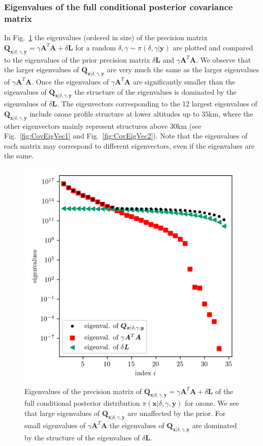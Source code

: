 \subsubsection{Eigenvalues of the full conditional posterior covariance matrix}
In Fig.~\ref{fig:PostCov} the eigenvalues (ordered in size) of the precision matrix $\bm{Q}_{ \bm{x}|\delta, \gamma,\bm{y}}=  \gamma \bm{A}^T \bm{A} + \delta \bm{L} $ for a random $\delta,\gamma \sim \pi(\delta,\gamma|\bm{y})$ are plotted and compared to the eigenvalues of the prior precision matrix $\delta \bm{L}$ and $\gamma \bm{A}^T \bm{A}$.
We observe that the larger eigenvalues of $\bm{Q}_{ \bm{x}|\delta, \gamma,\bm{y}}$ are very much the same as the larger eigenvalues of $\gamma \bm{A}^T \bm{A}$.
Once the eigenvalues of $\gamma \bm{A}^T \bm{A}$ are significantly smaller than the eigenvalues of $\bm{Q}_{ \bm{x}|\delta, \gamma,\bm{y}}$ the structure of the eigenvalues is dominated by the eigenvalues of $\delta \bm{L}$.
The eigenvectors corresponding to the 12 largest eigenvalues of $\bm{Q}_{ \bm{x}|\delta, \gamma,\bm{y}}$ include ozone profile structure at lower altitudes up to $35$km, where the other eigenvectors mainly represent structures above $30$km (see Fig.~\ref{fig:CovEigVec1} and Fig.~\ref{fig:CovEigVec2}).
Note that the eigenvalues of each matrix may correspond to different eigenvectors, even if the eigenvalues are the same.
\begin{figure}[ht!]
	\centering
	\includegraphics{CovSing.png}
	\caption[Eigenvalues of the posterior precision matrix]{Eigenvalues of the precision matrix of $\bm{Q}_{ \bm{x}|\delta, \gamma, \bm{y}}= \gamma \bm{A}^T \bm{A} + \delta \bm{L}$ of the full conditional posterior distribution $\pi(\bm{x}|\delta, \gamma, \bm{y})$ for ozone.
		We see that large eigenvalues of $\bm{Q}_{ \bm{x}|\delta, \gamma, \bm{y}} $ are unaffected by the prior.
		For small eigenvalues of $\gamma \bm{A}^T \bm{A}$ the eigenvalues of $\bm{Q}_{ \bm{x}|\delta, \gamma, \bm{y}} $ are dominated by the structure of the eigenvalues of $ \delta \bm{L}$.}
	\label{fig:PostCov}
\end{figure}
